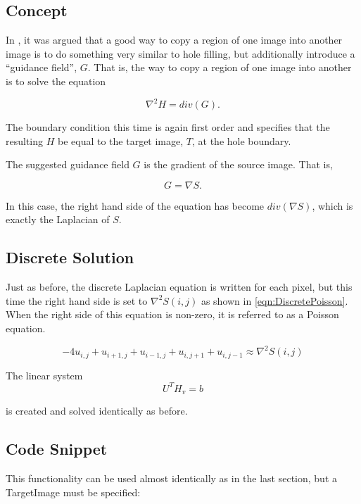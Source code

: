 \documentclass{InsightArticle}
\begin{document}
\subsection{Concept}

In \cite{PoissonImageEditing}, it was argued that a good way to copy a region of one image into another image is to do something very similar to hole filling, but additionally introduce a ``guidance field'', $G$. That is, the way to copy a region of one image into another is to solve the equation

\begin{equation}
\nabla^2 H = div(G).
\end{equation}

The boundary condition this time is again first order and specifies that the resulting $H$ be equal to the target image, $T$, at the hole boundary.

The suggested guidance field $G$ is the gradient of the source image. That is,

\begin{equation}
G = \nabla S.
\end{equation}

In this case, the right hand side of the equation has become $div(\nabla S)$, which is exactly the Laplacian of $S$.

\subsection{Discrete Solution}
Just as before, the discrete Laplacian equation is written for each pixel, but this time the right hand side is set to $\nabla^2 S(i,j)$ as shown in \ref{eqn:DiscretePoisson}. When the right side of this equation is non-zero, it is referred to as a Poisson equation.

\begin{equation}
\label{eqn:DiscretePoisson}
-4 u_{i,j} + u_{i+1,j} + u_{i-1,j} + u_{i,j+1} + u_{i,j-1} \approx \nabla^2 S(i,j)
\end{equation}

The linear system 
\begin{equation}
 U^T H_v = b
\end{equation}

is created and solved identically as before.

\subsection{Code Snippet}
This functionality can be used almost identically as in the last section, but a TargetImage must be specified:
\end{document}
